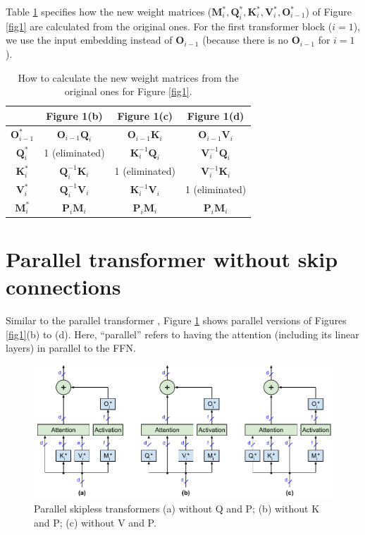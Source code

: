 \documentclass{article}
\newcommand{\mat}[1]{\mathbf{#1}}  %
\def\Q{\mat{Q}_i}
\def\K{\mat{K}_i}
\def\V{\mat{V}_i}
\def\P{\mat{P}_i}
\def\O{\mat{O}_{i-1}}
\def\M{\mat{M}_i}
\begin{document}
Table \ref{tab1} specifies how the new weight matrices ($\M^*, \Q^*, \K^*, \V^*, \O^*$) of Figure \ref{fig1} are calculated from the original ones. For the first transformer block ($i = 1$), we use the input embedding instead of $\O$ (because there is no $\O$ for $i = 1$).

\begingroup \begin{table} [h!] \centering  %
\renewcommand{\arraystretch}{1.2}  %
\begin{tabular}{cccc} \hline
         & Figure 1(b)     & Figure 1(c)     & Figure 1(d)    \\ \hline
  $\O^*$ & $\O \Q$         & $\O \K$         & $\O \V$        \\
  $\Q^*$ & 1 (eliminated)  & $\K^{-1} \Q$    & $\V^{-1} \Q$    \\
  $\K^*$ & $\Q^{-1} \K$    & 1 (eliminated)  & $\V^{-1} \K$    \\
  $\V^*$ & $\Q^{-1} \V$    & $\K^{-1} \V$     & 1 (eliminated) \\
  $\M^*$ & $\P \M$         & $\P \M$         & $\P \M$        \\ \hline
\end{tabular}
\caption{How to calculate the new weight matrices from the original ones for Figure \ref{fig1}.}
\label{tab1} \end{table} \endgroup

\section{Parallel transformer without skip connections}
Similar to the parallel transformer \cite{parallel}, Figure \ref{fig3} shows parallel versions of Figures \ref{fig1}(b) to (d). Here, “parallel” refers to having the attention (including its linear layers) in parallel to the FFN.

\begin{figure} [h!] \centering  %
  \includegraphics[scale=0.92]{../doc/fig/removeWeights_fig3.pdf}
  \caption{Parallel skipless transformers (a) without Q and P; (b) without K and P; (c) without V and P.}
\label{fig3} \end{figure}
\end{document}
